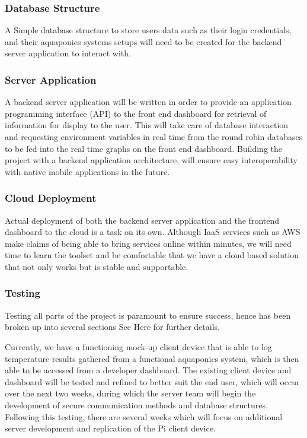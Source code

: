 \documentclass[11pt, oneside, a4paper, titlepage]{article}
\begin{document}
\subsubsection{Database Structure}
A Simple database structure to store users data such as their login credentials, and their aquaponics systems setups will need to be created for the backend server application to interact with. 

\subsubsection{Server Application}
A backend server application will be written in order to provide an application programming interface (API) to the front end dashboard for retrieval of information for display to the user.  This will take care of database interaction and requesting environment variables in real time from the round robin databases to be fed into the real time graphs on the front end dashboard.  Building the project with a backend application architecture, will ensure easy interoperability with native mobile applications in the future.

\subsubsection{Cloud Deployment}
Actual deployment of both the backend server application and the frontend dashboard to the cloud is a task on its own.  Although IaaS services such as AWS make claims of being able to bring services online within minutes, we will need time to learn the toolset and be comfortable that we have a cloud based solution that not only works but is stable and supportable. 

\subsubsection{Testing}
Testing all parts of the project is paramount to ensure success, 
 hence has been broken up into several sections  See Here for further details. 

Currently, we have a functioning mock-up client device that is able to log temperature results gathered from a functional aquaponics system, which is then able to be accessed from a developer dashboard. The existing client device and dashboard will be tested and refined to better suit the end user, which will occur over the next two weeks, during which the server team will begin the development of secure communication methods and database structures. Following this testing, there are several weeks which will focus on additional server development and replication of the Pi client device.  
\end{document}
